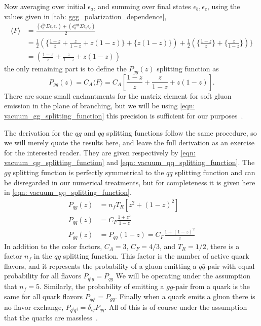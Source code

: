 \documentclass[main.tex]{subfiles}
\begin{document}
Now averaging over initial \(\epsilon_a\), and summing over final states \(\epsilon_b, \epsilon_c\), using the values given in \autoref{tab: ggg_polarization_dependence},
\begin{align}\label{eqn: ggg_polarizations_summed&averaged}
    \langle F \rangle &= \frac{(\epsilon_a^{\text{in}} \Sigma \epsilon_b\epsilon_c ) + (\epsilon_a^{\text{out}} \Sigma \epsilon_b\epsilon_c)}{2} \nonumber\\
    &= \frac{1}{2} \left( \{ \frac{1-z}{z} + \frac{z}{1-z} + z(1-z) \} + \{ z(1-z) \} \right) + \frac{1}{2} \left( \{\frac{1-z}{z} \} + \{ \frac{z}{1-z} \}\right) \} \nonumber\\
    &= \left( \frac{1-z}{z} + \frac{z}{1-z} + z(1-z) \right)
\end{align}
the only remaining part is to define the \(P_{gg}(z)\) splitting function as
\begin{equation}\label{eqn: vacuum_gg_splitting_function}
    P_{gg}(z) = C_A \langle F \rangle = C_A \left[ \frac{1-z}{z} + \frac{z}{1-z} + z(1-z) \right].
\end{equation}
There are some small enchantments for the matrix element for soft gluon emission in the plane of branching, but we will be using \autoref{eqn: vacuum_gg_splitting_function} this precision is sufficient for our purposes~\cite{ellis_stirling_webber_1996}.

The derivation for the \(qg\) and \(qq\) splitting functions follow the same procedure, so we will merely quote the results here, and leave the full derivation as an exercise for the interested reader. They are given respectively by \autoref{eqn: vacuum_qg_splitting_function} and \autoref{eqn: vacuum_qq_splitting_function}. The \(gq\) splitting function is perfectly symmetrical to the \(qq\) splitting function and can be disregarded in our numerical treatments, but for completeness it is given here in \autoref{eqn: vacuum_gq_splitting_function}.
\begin{align}
    P_{qg}(z) &= n_f T_R \left[ z^2 + (1-z)^2 \right] \label{eqn: vacuum_qg_splitting_function} \\
    P_{qq} (z) &= C_F \frac{1+z^2}{1-z} \label{eqn: vacuum_qq_splitting_function} \\
    P_{gq} (z) &= P_{qq}(1-z) = C_F \frac{1+(1-z)^2}{z}  \label{eqn: vacuum_gq_splitting_function}
\end{align}
In addition to the color factors, \(C_A = 3\), \(C_F=4/3\), and \(T_R=1/2\), there is a factor \(n_f\) in the \(qg\) splitting function. This factor is the number of active quark flavors, and it represents the probability of a gluon emitting a \(q\bar q\text{-pair}\) with equal probability for all flavors \(P_{q^ig} = P_{qg}\) We will be operating under the assumption that \(n_f = 5\). Similarly, the probability of emitting a \(gg\text{-pair}\) from a quark is the same for all quark flavors \(P_{gq^i} = P_{gq}\). Finally when a quark emits a gluon there is no flavor exchange, \(P_{q^iq^j} = \delta_{ij} P_{qq}\). All of this is of course under the assumption that the quarks are massless~\cite{AltarelliParisi_original}.
\end{document}
